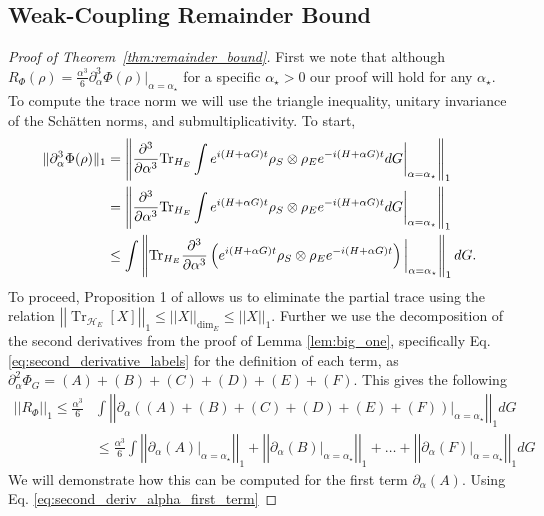 \documentclass[
 amsmath,amssymb,
 aps,
onecolumn, 
nofootinbib]{revtex4-2}
\newcommand{\brackets}[1]{\left[ #1 \right]}
\newcommand{\norm}[1]{\left|\left| #1 \right|\right|}
\DeclareMathOperator{\Tr}{Tr}
\newcommand{\partrace}[2]{\Tr_{#1} \brackets{ #2 }}
\newcommand{\hilb}{\mathcal{H}}
\begin{document}
\subsection{Weak-Coupling Remainder Bound} \label{sec:weak_coupling_remainder_bound}

\begin{proof}[Proof of Theorem~\ref{thm:remainder_bound}]
First we note that although $R_{\Phi}(\rho) = \frac{\alpha^3}{6} \partial_{\alpha}^3 \Phi(\rho)\big|_{\alpha = \alpha_{\star}}$ for a specific $ \alpha_{\star} > 0$ our proof will hold for any $\alpha_{\star}$. To compute the trace norm we will use the triangle inequality, unitary invariance of the Sch\"{a}tten norms, and submultiplicativity. To start,
\begin{align}
    \|\partial_\alpha^3 \Phi(\rho) \|_1 &= \left\| \frac{\partial^3}{\partial \alpha^3} {\rm Tr}_{H_E} \int e^{i(H+\alpha G)t} \rho_S \otimes \rho_E e^{-i(H+\alpha G)t} dG \bigg|_{\alpha = \alpha_{\star}} \right\|_1 \nonumber\\
    &= \left\| \frac{\partial^3}{\partial \alpha^3} {\rm Tr}_{H_E} \int e^{i(H+\alpha G)t} \rho_S \otimes \rho_E e^{-i(H+\alpha G)t} dG \bigg|_{\alpha = \alpha_{\star}} \right\|_1 \nonumber\\
    &\le    \int \left\|{\rm Tr}_{H_E}\frac{\partial^3}{\partial \alpha^3}\left( e^{i(H+\alpha G)t} \rho_S \otimes \rho_E e^{-i(H+\alpha G)t}\right) \bigg|_{\alpha = \alpha_{\star}} \right\|_1 dG.\label{eq:3derivBd}
\end{align}
To proceed, Proposition 1 of \cite{rastegin2012relations} allows us to eliminate the partial trace using the relation
$\norm{\partrace{\hilb_E}{X}}_{1} \le \norm{X}_{\dim_E} \le \norm{X}_1$. Further we use the decomposition of the second derivatives from the proof of Lemma \ref{lem:big_one}, specifically  Eq. \eqref{eq:second_derivative_labels} for the definition of each term, as $\partial_{\alpha}^2 \Phi_G = (A) + (B) + (C) + (D) +(E) + (F)$. This gives the following 
\begin{align}
    \norm{R_{\Phi}}_1 \le \frac{\alpha^3}{6} &\int \norm{\partial_{\alpha}((A) + (B) + (C) + (D) +(E) + (F)) \big|_{\alpha = \alpha_{\star}} }_1 dG \\
    &\le \frac{\alpha^3}{6} \int \norm{\partial_{\alpha}(A)\big|_{\alpha = \alpha_{\star}} }_1 + \norm{\partial_{\alpha}(B) \big|_{\alpha = \alpha_{\star}} }_1 + \ldots + \norm{\partial_{\alpha}(F) \big|_{\alpha = \alpha_{\star}} }_1 dG
\end{align}
We will demonstrate how this can be computed for the first term $\partial_{\alpha}(A)$. Using Eq. \eqref{eq:second_deriv_alpha_first_term}

\end{proof}
\end{document}
